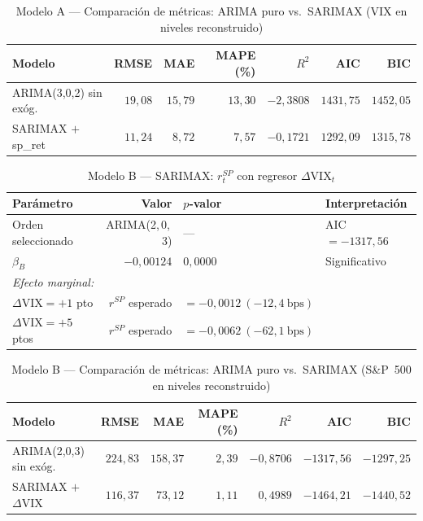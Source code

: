 \documentclass[12pt, a4paper]{article}
\begin{document}
\begin{table}[H]
    \centering
    \caption{Modelo A — Comparación de métricas: ARIMA puro vs.\ SARIMAX (VIX en niveles reconstruido)}
    \label{tab:metricas_a}
    \begin{tabular}{lrrrrrr}
        \toprule
        \textbf{Modelo} & \textbf{RMSE} & \textbf{MAE} & \textbf{MAPE (\%)} & \textbf{$R^2$} & \textbf{AIC} & \textbf{BIC} \\
        \midrule
        ARIMA(3,0,2) sin exóg. & $19{,}08$ & $15{,}79$ & $13{,}30$ & $-2{,}3808$ & $1431{,}75$ & $1452{,}05$ \\
        SARIMAX $+$ sp\_ret    & $11{,}24$ &  $8{,}72$ &  $7{,}57$ & $-0{,}1721$ & $1292{,}09$ & $1315{,}78$ \\
        \bottomrule
    \end{tabular}
\end{table}

\begin{table}[H]
    \centering
    \caption{Modelo B — SARIMAX: $r^{SP}_t$ con regresor $\Delta\text{VIX}_t$}
    \label{tab:sarimax_b}
    \begin{tabular}{lrll}
        \toprule
        \textbf{Parámetro} & \textbf{Valor} & \textbf{$p$-valor} & \textbf{Interpretación} \\
        \midrule
        Orden seleccionado & ARIMA(2,\,0,\,3) & --- & AIC $= -1317{,}56$ \\
        $\beta_B$          & $-0{,}00124$     & $0{,}0000$ & Significativo \\
        \midrule
        \multicolumn{4}{l}{\textit{Efecto marginal:}} \\
        $\Delta\text{VIX} = +1$ pto  & $r^{SP}$ esperado & $= -0{,}0012\ (-12{,}4\ \text{bps})$ & \\
        $\Delta\text{VIX} = +5$ ptos & $r^{SP}$ esperado & $= -0{,}0062\ (-62{,}1\ \text{bps})$ & \\
        \bottomrule
    \end{tabular}
\end{table}

\begin{table}[H]
    \centering
    \caption{Modelo B — Comparación de métricas: ARIMA puro vs.\ SARIMAX (S\&P~500 en niveles reconstruido)}
    \label{tab:metricas_b}
    \begin{tabular}{lrrrrrr}
        \toprule
        \textbf{Modelo} & \textbf{RMSE} & \textbf{MAE} & \textbf{MAPE (\%)} & \textbf{$R^2$} & \textbf{AIC} & \textbf{BIC} \\
        \midrule
        ARIMA(2,0,3) sin exóg. & $224{,}83$ & $158{,}37$ & $2{,}39$ & $-0{,}8706$ & $-1317{,}56$ & $-1297{,}25$ \\
        SARIMAX $+$ $\Delta$VIX & $116{,}37$ &  $73{,}12$ & $1{,}11$ &  $0{,}4989$ & $-1464{,}21$ & $-1440{,}52$ \\
        \bottomrule
    \end{tabular}
\end{table}
\end{document}
